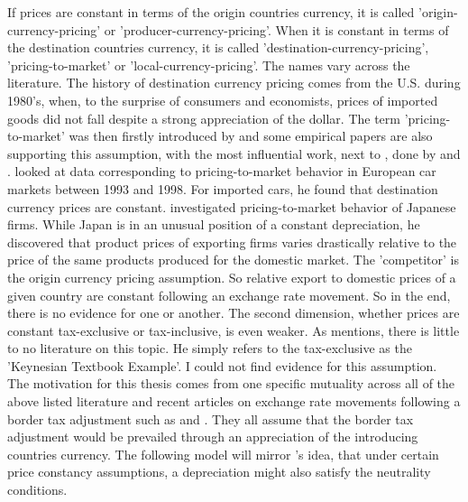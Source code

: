 If prices are constant in terms of the origin countries currency, it is called 'origin-currency-pricing' or 'producer-currency-pricing'. When it is constant in terms of the destination countries currency, it is called 'destination-currency-pricing', 'pricing-to-market' or 'local-currency-pricing'. The names vary across the literature. The history of destination currency pricing comes from the U.S. during 1980's, when, to the surprise of consumers and economists, prices of imported goods did not fall despite a strong appreciation of the dollar. The term 'pricing-to-market' was then firstly introduced by \cite{krugman1986pricing} and some empirical papers are also supporting this assumption, with the most influential work, next to \cite{krugman1986pricing}, done by \cite{gil2002export} and \cite{marston1990pricing}. \cite{gil2002export} looked at data corresponding to pricing-to-market behavior in European car markets between 1993 and 1998. For imported cars, he found that destination currency prices are constant. \cite{marston1990pricing} investigated pricing-to-market behavior of Japanese firms. While Japan is in an unusual position of a constant depreciation, he discovered that product prices of exporting firms varies drastically relative to the price of the same products produced for the domestic market. The 'competitor' is the origin currency pricing assumption. So relative export to domestic prices of a given country are constant following an exchange rate movement. So in the end, there is no evidence for one or another. The second dimension, whether prices are constant tax-exclusive or tax-inclusive, is even weaker. As \cite{buiter2017exchange} mentions, there is little to no literature on this topic. He simply refers to the tax-exclusive as the 'Keynesian Textbook Example'. I could not find evidence for this assumption. \\ 

The motivation for this thesis comes from one specific mutuality across all of the above listed literature and recent articles on exchange rate movements following a border tax adjustment such as \cite{feldstein2017house} and \cite{auerbach2017destination}. They all assume that the border tax adjustment would be prevailed through an appreciation of the introducing countries currency. The following model will mirror \cite{buiter2017exchange}'s idea, that under certain price constancy assumptions, a depreciation might also satisfy the neutrality conditions. 
